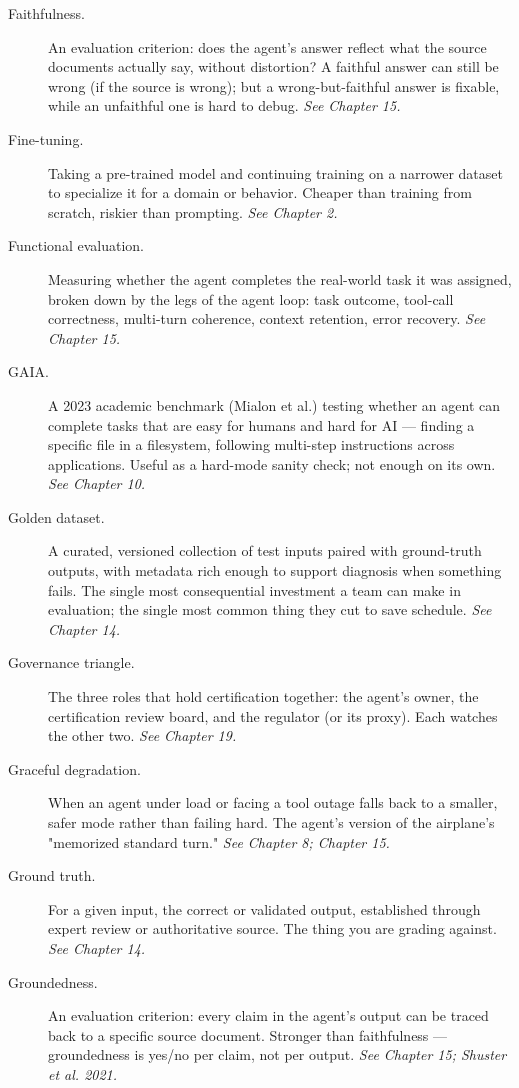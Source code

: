 \begin{description}
  \item[Faithfulness.] An evaluation criterion: does the agent's answer reflect what the source documents actually say, without distortion? A faithful answer can still be wrong (if the source is wrong); but a wrong-but-faithful answer is fixable, while an unfaithful one is hard to debug. \textit{See Chapter 15.}
  \item[Fine-tuning.] Taking a pre-trained model and continuing training on a narrower dataset to specialize it for a domain or behavior. Cheaper than training from scratch, riskier than prompting. \textit{See Chapter 2.}
  \item[Functional evaluation.] Measuring whether the agent completes the real-world task it was assigned, broken down by the legs of the agent loop: task outcome, tool-call correctness, multi-turn coherence, context retention, error recovery. \textit{See Chapter 15.}
  \item[GAIA.] A 2023 academic benchmark (Mialon et al.) testing whether an agent can complete tasks that are easy for humans and hard for AI — finding a specific file in a filesystem, following multi-step instructions across applications. Useful as a hard-mode sanity check; not enough on its own. \textit{See Chapter 10.}
  \item[Golden dataset.] A curated, versioned collection of test inputs paired with ground-truth outputs, with metadata rich enough to support diagnosis when something fails. The single most consequential investment a team can make in evaluation; the single most common thing they cut to save schedule. \textit{See Chapter 14.}
  \item[Governance triangle.] The three roles that hold certification together: the agent's owner, the certification review board, and the regulator (or its proxy). Each watches the other two. \textit{See Chapter 19.}
  \item[Graceful degradation.] When an agent under load or facing a tool outage falls back to a smaller, safer mode rather than failing hard. The agent's version of the airplane's "memorized standard turn." \textit{See Chapter 8; Chapter 15.}
  \item[Ground truth.] For a given input, the correct or validated output, established through expert review or authoritative source. The thing you are grading against. \textit{See Chapter 14.}
  \item[Groundedness.] An evaluation criterion: every claim in the agent's output can be traced back to a specific source document. Stronger than faithfulness — groundedness is yes/no per claim, not per output. \textit{See Chapter 15; Shuster et al. 2021.}

\end{description}
